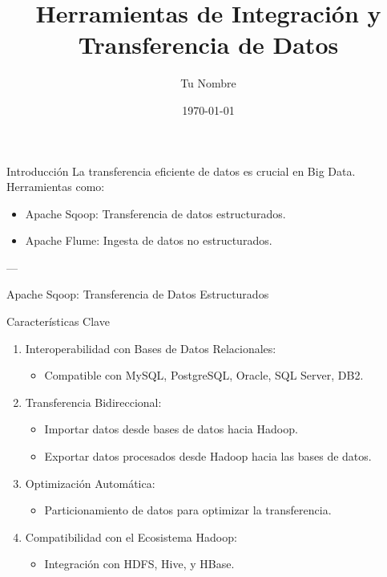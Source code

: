 \documentclass[presentation]{beamer}
\author{Tu Nombre}
\date{\today{}}
\title{Herramientas de Integración y Transferencia de Datos}
\begin{document}
\maketitle

\begin{frame}[label={sec:orgb6b4f1b}]{Introducción}
La transferencia eficiente de datos es crucial en Big Data. Herramientas como:
\begin{itemize}
\item \alert{\alert{Apache Sqoop}}: Transferencia de datos estructurados.
\item \alert{\alert{Apache Flume}}: Ingesta de datos no estructurados.
\end{itemize}

---
\end{frame}

\begin{frame}[label={sec:orge5d0d03}]{Apache Sqoop: Transferencia de Datos Estructurados}
\begin{block}{Características Clave}
\begin{enumerate}
\item \alert{\alert{Interoperabilidad con Bases de Datos Relacionales}}:
\begin{itemize}
\item Compatible con MySQL, PostgreSQL, Oracle, SQL Server, DB2.
\end{itemize}
\item \alert{\alert{Transferencia Bidireccional}}:
\begin{itemize}
\item Importar datos desde bases de datos hacia Hadoop.
\item Exportar datos procesados desde Hadoop hacia las bases de datos.
\end{itemize}
\item \alert{\alert{Optimización Automática}}:
\begin{itemize}
\item Particionamiento de datos para optimizar la transferencia.
\end{itemize}
\item \alert{\alert{Compatibilidad con el Ecosistema Hadoop}}:
\begin{itemize}
\item Integración con HDFS, Hive, y HBase.
\end{itemize}
\end{enumerate}
\end{block}


\end{frame}
\end{document}
